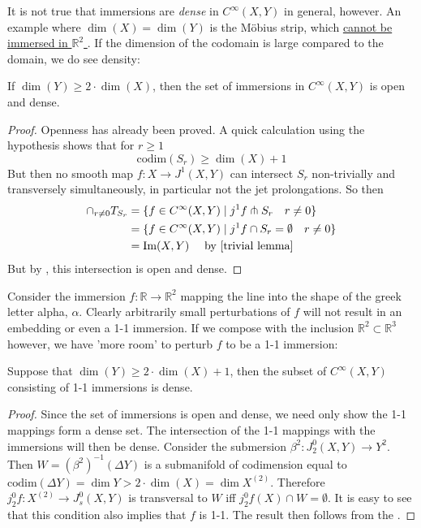 \documentclass[12pt]{article}
\newcommand{\RR}{\mathbb{R}}
\begin{document}
It is not true that immersions are \emph{dense} in $C^\infty(X, Y)$ in general, however. An example where $\dim(X) = \dim(Y)$ is the Möbius strip, which \href{https://math.stackexchange.com/questions/453567/there-is-no-immersion-of-the-m%C3%B6bius-band-in-the-plane}{cannot be immersed in $\RR^2$
}. If the dimension of the codomain is large compared to the domain, we do see density:

\begin{theorem} 
    If $\dim(Y) \geq 2\cdot \dim(X)$, then the set of immersions in $C^\infty(X, Y)$ is open and dense. 
\end{theorem}

\begin{proof}
    Openness has already been proved. A quick calculation using the hypothesis shows that for $r\geq 1$
    $$
    \text{codim}(S_r) \geq \dim(X)+1
    $$
    But then no smooth map $f: X \to J^1(X, Y)$ can intersect $S_r$ non-trivially and transversely simultaneously, in particular not the jet prolongations. So then
    \begin{align*}
    \cap_{r\neq 0} T_{S_r} & = \{f \in C^\infty(X, Y) \mid j^1 f \pitchfork S_r \quad r\neq 0\} \\ 
    & =\{ f \in C^\infty(X, Y) \mid j^1 f \cap S_r = \emptyset \quad  r\neq 0\} \\ 
    &= \text{Im}(X, Y) \quad \text{ by \Autoref{trivial lemma}}
    \end{align*}
    But by , this intersection is open and dense. 
\end{proof}

Consider the immersion $f: \RR \to \RR^2$ mapping the line into the shape of the greek letter alpha, $\alpha$. Clearly arbitrarily small perturbations of $f$ will not result in an embedding or even a 1-1 immersion. If we compose with the inclusion $\RR^2 \subset \RR^3$ however, we have 'more room' to perturb $f$ to be a 1-1 immersion: 

\begin{theorem} 
    Suppose that $\dim(Y) \geq 2\cdot \dim(X) + 1$, then the subset of $C^\infty(X, Y)$ consisting of 1-1 immersions is dense.
\end{theorem}

\begin{proof}
    Since the set of immersions is open and dense, we need only show the 1-1 mappings form a dense set. The intersection of the 1-1 mappings with the immersions will then be dense. Consider the submersion $\beta^2: J^0_2(X, Y) \to Y^2$. Then $W = (\beta^2)^{-1}(\Delta Y)$ is a submanifold of codimension equal to $\text{codim}(\Delta Y) = \dim Y > 2 \cdot \dim(X) = \dim X^{(2)}$. Therefore $j^0_2 f : X^{(2)} \to J^0_s(X, Y)$ is transversal to $W$ iff $j^0_2 f (X) \cap W = \emptyset$. It is easy to see that this condition also implies that $f$ is 1-1. The result then follows from the .  
\end{proof}
\end{document}
